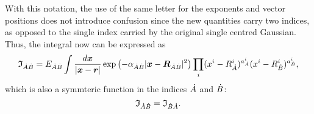 With this notation, the use of the same letter for the exponents and vector positions does not introduce confusion since the new quantities carry two indices, as opposed to the single index carried by the original single centred Gaussian. Thus, the integral now can be expressed as
%
\begin{equation}\label{eq:iabred}
   \mathfrak{I}_{\dot{A}\dot{B}}=E_{\dot{A}\dot{B}}\int\frac{d\boldsymbol{x}}{|\boldsymbol{x}-\boldsymbol{r}|}
      \exp\left(-\alpha_{\dot{A}\dot{B}}|\boldsymbol{x}-\boldsymbol{R}_{\dot{A}\dot{B}}|^2\right)
      \prod_i(x^i-R_{\dot{A}}^i)^{a_{\dot{A}}^i}(x^i-R_{\dot{B}}^i)^{a_{\dot{B}}^i},
\end{equation}
%
which is also a symmteric function in the indices $\dot{A}$ and $\dot{B}$:
\begin{equation}
   \mathfrak{I}_{\dot{A}\dot{B}}=\mathfrak{I}_{\dot{B}\dot{A}}.
\end{equation}

